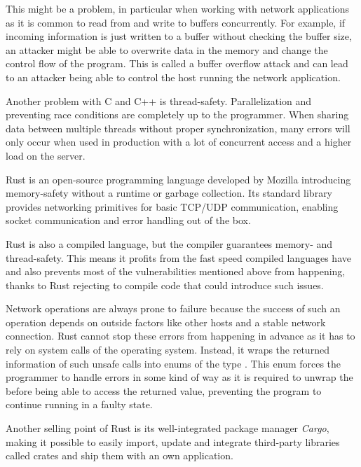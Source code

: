 This might be a problem, in particular when working with network applications as it is common to read from and write to
buffers concurrently. For example, if incoming information is just written to a buffer without checking the buffer
size, an attacker might be able to overwrite data in the memory and change the control flow of the program. This is
called a buffer overflow attack and can lead to an attacker being able to control the host running the network
application. \cite{c00buffer}

Another problem with C and C++ is thread-safety. Parallelization and preventing race conditions are completely up to
the programmer. When sharing data between multiple threads without proper synchronization, many errors will only occur
when used in production with a lot of concurrent access and a higher load on the server.

Rust is an open-source programming language developed by Mozilla introducing memory-safety without a runtime or garbage
collection. Its standard library provides networking primitives for basic TCP/UDP communication, enabling socket
communication and error handling out of the box. \cite{rust-language}

Rust is also a compiled language, but the compiler guarantees memory- and thread-safety. This means it profits from the
fast speed compiled languages have and also prevents most of the vulnerabilities mentioned above from happening, thanks
to Rust rejecting to compile code that could introduce such issues.

Network operations are always prone to failure because the success of such an operation depends on outside factors like
other hosts and a stable network connection. Rust cannot stop these errors from happening in advance as it has to rely
on system calls of the operating system. Instead, it wraps the returned information of such unsafe calls into enums of
the type . This enum forces the programmer to handle errors in some kind of way as it is
required to unwrap the  before being able to access the returned value, preventing the program to continue
running in a faulty state.

Another selling point of Rust is its well-integrated package manager \textit{Cargo}, making it possible to easily
import, update and integrate third-party libraries called crates and ship them with an own application.

